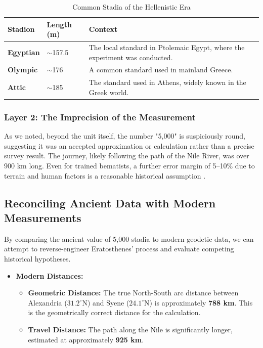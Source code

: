 \documentclass[11pt]{article}
\begin{document}
\begin{table}[htbp]
\centering
\caption{Common Stadia of the Hellenistic Era}
\label{tab:stadia}
\small
\begin{tabular}{@{}lll@{}}
\toprule
\textbf{Stadion} & \textbf{Length (m)} & \textbf{Context} \\
\midrule
\textbf{Egyptian} & $\sim$157.5 & The local standard in Ptolemaic Egypt, where the experiment was conducted. \\
\addlinespace
\textbf{Olympic} & $\sim$176 & A common standard used in mainland Greece. \\
\addlinespace
\textbf{Attic} & $\sim$185 & The standard used in Athens, widely known in the Greek world. \\
\bottomrule
\end{tabular}
\end{table}

\subsubsection{Layer 2: The Imprecision of the Measurement}
As we noted, beyond the unit itself, the number "5,000" is suspiciously round, suggesting it was an accepted approximation or calculation rather than a precise survey result. The journey, likely following the path of the Nile River, was over 900 km long. Even for trained bematists, a further error margin of 5--10\% due to terrain and human factors is a reasonable historical assumption \cite{Engels1985}.

\subsection{Reconciling Ancient Data with Modern Measurements}

By comparing the ancient value of 5,000 stadia to modern geodetic data, we can attempt to reverse-engineer Eratosthenes' process and evaluate competing historical hypotheses.

\begin{itemize}
    \item \textbf{Modern Distances:}
    \begin{itemize}
        \item \textbf{Geometric Distance:} The true North-South arc distance between Alexandria ($31.2^{\circ}$N) and Syene ($24.1^{\circ}$N) is approximately \textbf{788 km}. This is the geometrically correct distance for the calculation.
        \item \textbf{Travel Distance:} The path along the Nile is significantly longer, estimated at approximately \textbf{925 km}.
    \end{itemize}
\end{itemize}
\end{document}

